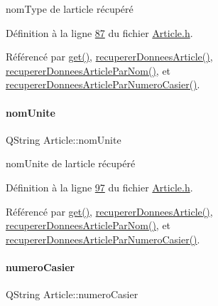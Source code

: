 nom\+Type de l\textquotesingle{}article récupéré 



Définition à la ligne \hyperlink{_article_8h_source_l00087}{87} du fichier \hyperlink{_article_8h_source}{Article.\+h}.



Référencé par \hyperlink{_article_8cpp_source_l00266}{get()}, \hyperlink{_article_8cpp_source_l00050}{recuperer\+Donnees\+Article()}, \hyperlink{_article_8cpp_source_l00103}{recuperer\+Donnees\+Article\+Par\+Nom()}, et \hyperlink{_article_8cpp_source_l00156}{recuperer\+Donnees\+Article\+Par\+Numero\+Casier()}.

\mbox{\label{class_article_a43a20e248e57150af0546c9f4b6b74c3}} 
\paragraph{\texorpdfstring{nom\+Unite}{nomUnite}}
{\footnotesize\ttfamily Q\+String Article\+::nom\+Unite\hspace{0.3cm}{\ttfamily [private]}}



nom\+Unite de l\textquotesingle{}article récupéré 



Définition à la ligne \hyperlink{_article_8h_source_l00097}{97} du fichier \hyperlink{_article_8h_source}{Article.\+h}.



Référencé par \hyperlink{_article_8cpp_source_l00266}{get()}, \hyperlink{_article_8cpp_source_l00050}{recuperer\+Donnees\+Article()}, \hyperlink{_article_8cpp_source_l00103}{recuperer\+Donnees\+Article\+Par\+Nom()}, et \hyperlink{_article_8cpp_source_l00156}{recuperer\+Donnees\+Article\+Par\+Numero\+Casier()}.

\mbox{\label{class_article_a4b8dd9598cc16200c60c7f55196fc26d}} 
\paragraph{\texorpdfstring{numero\+Casier}{numeroCasier}}
{\footnotesize\ttfamily Q\+String Article\+::numero\+Casier\hspace{0.3cm}{\ttfamily [private]}}



